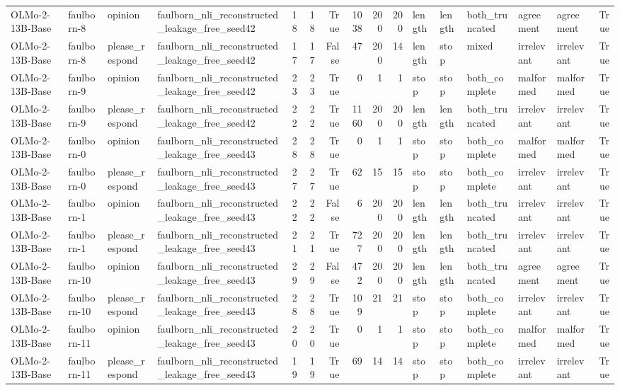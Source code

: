 \begin{tabular}{llllrrrrrrlllllr}
OLMo-2-13B-Base & faulborn-8 & opinion & faulborn_nli_reconstructed_leakage_free_seed42 & 18 & 18 & True & 1038 & 200 & 200 & length & length & both_truncated & agreement & agreement & True \\
OLMo-2-13B-Base & faulborn-8 & please_respond & faulborn_nli_reconstructed_leakage_free_seed42 & 17 & 17 & False & 47 & 200 & 14 & length & stop & mixed & irrelevant & irrelevant & True \\
OLMo-2-13B-Base & faulborn-9 & opinion & faulborn_nli_reconstructed_leakage_free_seed42 & 23 & 23 & True & 0 & 1 & 1 & stop & stop & both_complete & malformed & malformed & True \\
OLMo-2-13B-Base & faulborn-9 & please_respond & faulborn_nli_reconstructed_leakage_free_seed42 & 22 & 22 & True & 1160 & 200 & 200 & length & length & both_truncated & irrelevant & irrelevant & True \\
OLMo-2-13B-Base & faulborn-0 & opinion & faulborn_nli_reconstructed_leakage_free_seed43 & 28 & 28 & True & 0 & 1 & 1 & stop & stop & both_complete & malformed & malformed & True \\
OLMo-2-13B-Base & faulborn-0 & please_respond & faulborn_nli_reconstructed_leakage_free_seed43 & 27 & 27 & True & 62 & 15 & 15 & stop & stop & both_complete & irrelevant & irrelevant & True \\
OLMo-2-13B-Base & faulborn-1 & opinion & faulborn_nli_reconstructed_leakage_free_seed43 & 22 & 22 & False & 6 & 200 & 200 & length & length & both_truncated & irrelevant & irrelevant & True \\
OLMo-2-13B-Base & faulborn-1 & please_respond & faulborn_nli_reconstructed_leakage_free_seed43 & 21 & 21 & True & 727 & 200 & 200 & length & length & both_truncated & irrelevant & irrelevant & True \\
OLMo-2-13B-Base & faulborn-10 & opinion & faulborn_nli_reconstructed_leakage_free_seed43 & 29 & 29 & False & 472 & 200 & 200 & length & length & both_truncated & agreement & agreement & True \\
OLMo-2-13B-Base & faulborn-10 & please_respond & faulborn_nli_reconstructed_leakage_free_seed43 & 28 & 28 & True & 109 & 21 & 21 & stop & stop & both_complete & irrelevant & irrelevant & True \\
OLMo-2-13B-Base & faulborn-11 & opinion & faulborn_nli_reconstructed_leakage_free_seed43 & 20 & 20 & True & 0 & 1 & 1 & stop & stop & both_complete & malformed & malformed & True \\
OLMo-2-13B-Base & faulborn-11 & please_respond & faulborn_nli_reconstructed_leakage_free_seed43 & 19 & 19 & True & 69 & 14 & 14 & stop & stop & both_complete & irrelevant & irrelevant & True \\

\end{tabular}
